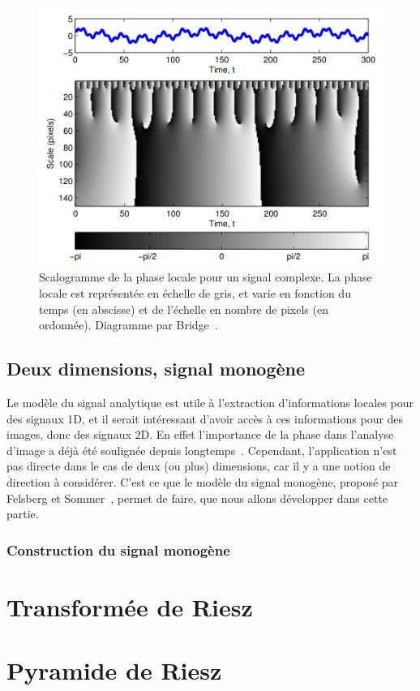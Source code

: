\begin{figure}
    \centering
    \includegraphics[width=\textwidth]{contenu/resources/images/scalogram}
    \caption{Scalogramme de la phase locale pour un signal complexe. La phase locale est représentée en échelle de gris, et varie en fonction du temps (en abscisse) et de l'échelle en nombre de pixels (en ordonnée). Diagramme par Bridge~\cite{bridge_introduction_2018}.}
    \label{fig:scalogram}
\end{figure}


\subsection{Deux dimensions, signal monogène}

Le modèle du signal analytique est utile à l'extraction d'informations locales pour des signaux 1D, et il serait intéressant d'avoir accès à ces informations pour des images, donc des signaux 2D. En effet l'importance de la phase dans l'analyse d'image a déjà été soulignée depuis longtemps~\cite{oppenheim_importance_1981}. Cependant, l'application n'est pas directe dans le cas de deux (ou plus) dimensions, car il y a une notion de direction à considérer. C'est ce que le modèle du signal monogène, proposé par Felsberg et Sommer~\cite{felsberg_monogenic_2001}, permet de faire, que nous allons développer dans cette partie.

\subsubsection{Construction du signal monogène}



\section{Transformée de Riesz}

\section{Pyramide de Riesz}
